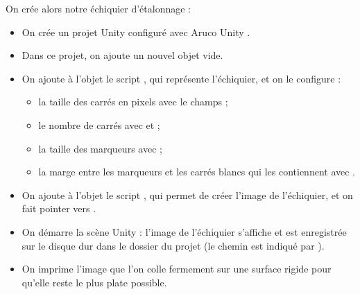 On crée alors notre échiquier d'étalonnage  :
\begin{itemize}
  \item On crée un projet Unity configuré avec Aruco Unity .
  \item Dans ce projet, on ajoute un nouvel objet vide.
  \item On ajoute à l'objet le script , qui représente l'échiquier, et on le configure :
  \begin{itemize}
    \item la taille des carrés en pixels avec le champs  ;
    \item le nombre de carrés avec  et  ;
    \item la taille des marqueurs avec  ;
    \item la marge entre les marqueurs et les carrés blancs qui les contiennent avec .
  \end{itemize}
  \item On ajoute à l'objet le script , qui permet de créer l'image de l'échiquier, et on fait pointer  vers .
  \item On démarre la scène Unity : l'image de l'échiquier s'affiche et est enregistrée sur le disque dur dans le dossier du projet (le chemin est indiqué par ).
  \item On imprime l'image que l'on colle fermement sur une surface rigide pour qu'elle reste le plus plate possible.
\end{itemize}


